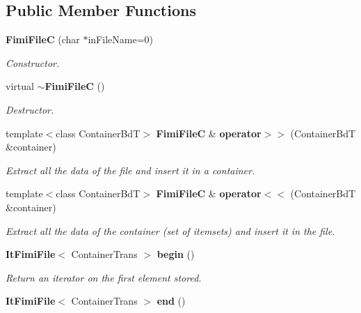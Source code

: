 \subsection*{Public Member Functions}
\begin{CompactItemize}
\item 
{\bf Fimi\-File\-C} (char $\ast$in\-File\-Name=0)
\begin{CompactList}\small\item\em Constructor. \item\end{CompactList}\item 
virtual {\bf $\sim$Fimi\-File\-C} ()
\begin{CompactList}\small\item\em Destructor. \item\end{CompactList}\item 
template$<$class Container\-Bd\-T$>$ {\bf Fimi\-File\-C} \& {\bf operator$>$$>$} (Container\-Bd\-T \&container)
\begin{CompactList}\small\item\em Extract all the data of the file and insert it in a container. \item\end{CompactList}\item 
template$<$class Container\-Bd\-T$>$ {\bf Fimi\-File\-C} \& {\bf operator$<$$<$} (Container\-Bd\-T \&container)
\begin{CompactList}\small\item\em Extract all the data of the container (set of itemsets) and insert it in the file. \item\end{CompactList}\item 
{\bf It\-Fimi\-File}$<$ Container\-Trans $>$ {\bf begin} ()\label{class_fimi_file_c_e89aafdad5202e8653be2892b2ea7dc5}

\begin{CompactList}\small\item\em Return an iterator on the first element stored. \item\end{CompactList}\item 
{\bf It\-Fimi\-File}$<$ Container\-Trans $>$ {\bf end} ()\label{class_fimi_file_c_c943eb9bd7e1a038ae002b4942d3fca8}


\end{CompactItemize}
